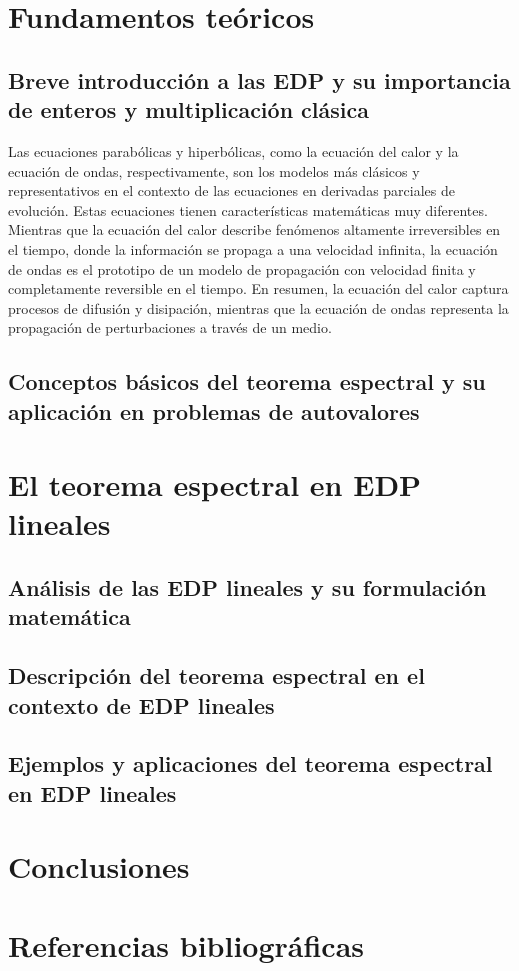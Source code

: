 \documentclass{article}
\begin{document}
\newpage

\section{Fundamentos teóricos}
    \subsection{Breve introducción a las EDP y su importancia de enteros y multiplicación clásica}
    Las ecuaciones parabólicas y hiperbólicas, como la ecuación del calor y la ecuación de ondas, respectivamente, son los modelos más clásicos y representativos en el contexto de las ecuaciones en derivadas parciales de evolución. Estas ecuaciones tienen características matemáticas muy diferentes. Mientras que la ecuación del calor describe fenómenos altamente irreversibles en el tiempo, donde la información se propaga a una velocidad infinita, la ecuación de ondas es el prototipo de un modelo de propagación con velocidad finita y completamente reversible en el tiempo. En resumen, la ecuación del calor captura procesos de difusión y disipación, mientras que la ecuación de ondas representa la propagación de perturbaciones a través de un medio.
    \subsection{Conceptos básicos del teorema espectral y su aplicación en problemas de autovalores}

\newpage

\section{El teorema espectral en EDP lineales}
    \subsection{Análisis de las EDP lineales y su formulación matemática}
    \subsection{Descripción del teorema espectral en el contexto de EDP lineales}
    \subsection{Ejemplos y aplicaciones del teorema espectral en EDP lineales}

\newpage

\section{Conclusiones}
\newpage

\section{Referencias bibliográficas}

\newpage
\end{document}
